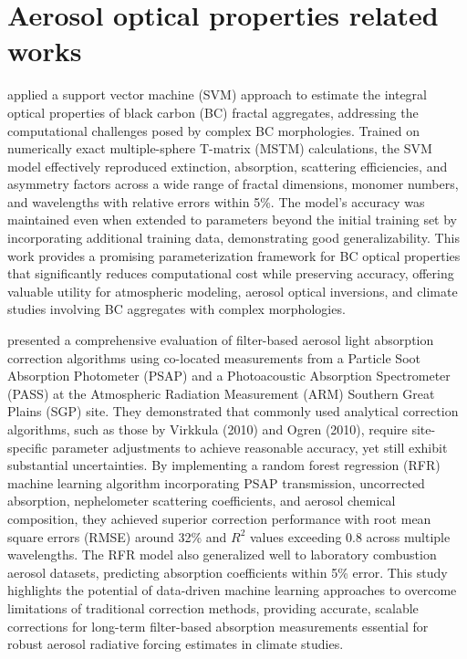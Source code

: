 \documentclass[11pt]{article}
\begin{document}
\section{Aerosol optical properties related works}
\citet{luo2018applying} applied a support vector machine (SVM) approach to estimate the integral optical properties of black carbon (BC) fractal aggregates, addressing the computational challenges posed by complex BC morphologies. Trained on numerically exact multiple-sphere T-matrix (MSTM) calculations, the SVM model effectively reproduced extinction, absorption, scattering efficiencies, and asymmetry factors across a wide range of fractal dimensions, monomer numbers, and wavelengths with relative errors within 5\%. The model’s accuracy was maintained even when extended to parameters beyond the initial training set by incorporating additional training data, demonstrating good generalizability. This work provides a promising parameterization framework for BC optical properties that significantly reduces computational cost while preserving accuracy, offering valuable utility for atmospheric modeling, aerosol optical inversions, and climate studies involving BC aggregates with complex morphologies.

\citet{kumar2022correcting} presented a comprehensive evaluation of filter-based aerosol light absorption correction algorithms using co-located measurements from a Particle Soot Absorption Photometer (PSAP) and a Photoacoustic Absorption Spectrometer (PASS) at the Atmospheric Radiation Measurement (ARM) Southern Great Plains (SGP) site. They demonstrated that commonly used analytical correction algorithms, such as those by Virkkula (2010) and Ogren (2010), require site-specific parameter adjustments to achieve reasonable accuracy, yet still exhibit substantial uncertainties. By implementing a random forest regression (RFR) machine learning algorithm incorporating PSAP transmission, uncorrected absorption, nephelometer scattering coefficients, and aerosol chemical composition, they achieved superior correction performance with root mean square errors (RMSE) around 32\% and \(R^2\) values exceeding 0.8 across multiple wavelengths. The RFR model also generalized well to laboratory combustion aerosol datasets, predicting absorption coefficients within 5\% error. This study highlights the potential of data-driven machine learning approaches to overcome limitations of traditional correction methods, providing accurate, scalable corrections for long-term filter-based absorption measurements essential for robust aerosol radiative forcing estimates in climate studies.
\end{document}
